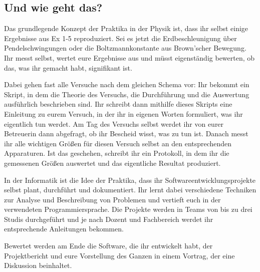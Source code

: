 \subsection{Und wie geht das?}

Das grundlegende Konzept der Praktika in der Physik ist, dass ihr selbst einige Ergebnisse aus \gls{Ex} 1-5 reproduziert. Sei es jetzt die Erdbeschleunigung über Pendelschwingungen oder die Boltzmannkonstante aus Brown'scher Bewegung. Ihr messt selbst, wertet eure Ergebnisse aus und müsst eigenständig bewerten, ob das, was ihr gemacht habt, signifikant ist.

Dabei gehen fast alle Versuche nach dem gleichen Schema vor: Ihr bekommt ein Skript, in dem die Theorie des Versuchs, die Durchführung und die Auswertung ausführlich beschrieben sind. Ihr schreibt dann mithilfe dieses Skripts eine Einleitung zu eurem Versuch, in der ihr in eigenen Worten formuliert, was ihr eigentlich tun werdet. Am Tag des Versuchs selbst werdet ihr von eurer Betreuerin dann abgefragt, ob ihr Bescheid wisst, was zu tun ist. Danach messt ihr alle wichtigen Größen für diesen Versuch selbst an den entsprechenden Apparaturen. Ist das geschehen, schreibt ihr ein Protokoll, in dem ihr die gemessenen Größen auswertet und das eigentliche Resultat produziert.

In der Informatik ist die Idee der Praktika, dass ihr Softwareentwicklungsprojekte selbst plant, durchführt und dokumentiert. Ihr lernt dabei verschiedene Techniken zur Analyse und Beschreibung von Problemen und vertieft euch in der verwendeten Programmiersprache. Die Projekte werden in Teams von bis zu drei Studis durchgeführt und je nach Dozent und Fachbereich werdet ihr entsprechende Anleitungen bekommen.

Bewertet werden am Ende die Software, die ihr entwickelt habt, der Projektbericht und eure Vorstellung des Ganzen in einem Vortrag, der eine Diskussion beinhaltet.
